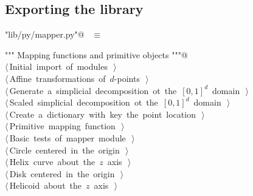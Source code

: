 \documentclass[11pt,oneside]{article}	%
\begin{document}
\subsection{Exporting the library}
\begin{flushleft} \small \label{scrap43}
\verb@"lib/py/mapper.py"@\nobreak\ {\footnotesize {} }$\equiv$
\vspace{-1ex}
\begin{list}{}{} \item
\mbox{}\verb@""" Mapping functions and primitive objects """@\\
\mbox{}\verb@@\hbox{$\langle\,$Initial import of modules\nobreak\ {\footnotesize {}}$\,\rangle$}\verb@@\\
\mbox{}\verb@@\hbox{$\langle\,$Affine transformations of $d$-points\nobreak\ {\footnotesize {}}$\,\rangle$}\verb@@\\
\mbox{}\verb@@\hbox{$\langle\,$Generate a simplicial decomposition ot the $[0,1]^d$ domain\nobreak\ {\footnotesize {}}$\,\rangle$}\verb@@\\
\mbox{}\verb@@\hbox{$\langle\,$Scaled simplicial decomposition ot the $[0,1]^d$ domain\nobreak\ {\footnotesize {}}$\,\rangle$}\verb@@\\
\mbox{}\verb@@\hbox{$\langle\,$Create a dictionary with key the point location\nobreak\ {\footnotesize {}}$\,\rangle$}\verb@@\\
\mbox{}\verb@@\hbox{$\langle\,$Primitive mapping function\nobreak\ {\footnotesize {}}$\,\rangle$}\verb@@\\
\mbox{}\verb@@\hbox{$\langle\,$Basic tests of mapper module\nobreak\ {\footnotesize {}}$\,\rangle$}\verb@@\\
\mbox{}\verb@@\hbox{$\langle\,$Circle centered in the origin\nobreak\ {\footnotesize {}}$\,\rangle$}\verb@@\\
\mbox{}\verb@@\hbox{$\langle\,$Helix curve about the $z$ axis\nobreak\ {\footnotesize {}}$\,\rangle$}\verb@@\\
\mbox{}\verb@@\hbox{$\langle\,$Disk centered in the origin\nobreak\ {\footnotesize {}}$\,\rangle$}\verb@@\\
\mbox{}\verb@@\hbox{$\langle\,$Helicoid about the $z$ axis\nobreak\ {\footnotesize {}}$\,\rangle$}\verb@@\\

\end{list}
\end{flushleft}
\end{document}
